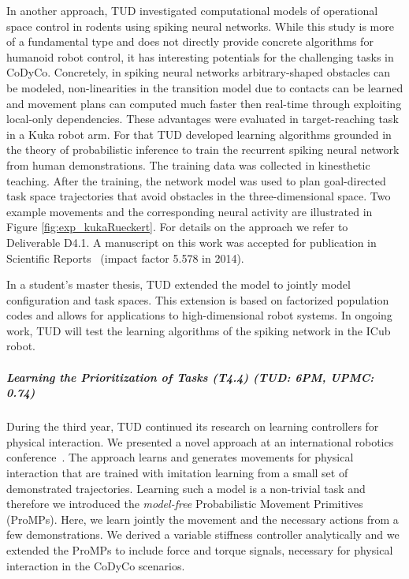 In another approach, TUD investigated computational models of operational space 
control in rodents using spiking neural networks. While this study is more of a 
fundamental type and does not directly provide concrete algorithms for humanoid 
robot control, it has interesting potentials for the challenging tasks in 
CoDyCo. Concretely, in spiking neural networks arbitrary-shaped obstacles can be 
modeled, non-linearities in the transition model due to contacts can be learned 
and movement plans can computed much faster then real-time through exploiting 
local-only dependencies. These advantages were evaluated in target-reaching task 
in a Kuka robot arm. For that TUD developed learning algorithms grounded in the 
theory of probabilistic inference to train the recurrent spiking neural network 
from human demonstrations. The training data was collected in kinesthetic 
teaching. After the training, the network model was used to plan goal-directed 
task space trajectories that avoid obstacles in the three-dimensional space. Two 
example movements and the corresponding neural activity are illustrated in 
Figure \ref{fig:exp_kukaRueckert}. For details on the approach we refer to 
Deliverable D4.1. A manuscript on this work was accepted for publication in 
Scientific Reports~\cite{Rueckert_SR_2016} (impact factor 5.578 in 2014). 

In a student's master thesis, TUD extended the model to jointly model 
configuration and task spaces. This extension is based on factorized population 
codes and allows for applications to high-dimensional robot systems. In ongoing 
work, TUD will test the learning algorithms of the spiking network in the ICub 
robot.    


\subparagraph*{Learning the Prioritization of Tasks (T4.4) (TUD: 6PM, UPMC: 0.74)}%

During the third year, TUD continued its research on learning controllers for 
physical interaction. We presented a novel approach at an international robotics 
conference~\cite{paraschos2015model}. The approach learns and generates 
movements for physical interaction that are trained with imitation learning from 
a small set of demonstrated trajectories. Learning such a model is a non-trivial 
task and therefore we introduced the \textit{model-free} Probabilistic Movement 
Primitives (ProMPs). Here, we learn jointly the movement and the necessary 
actions from a few demonstrations. We derived a variable stiffness controller 
analytically and we extended the ProMPs to include force and torque signals, 
necessary for physical interaction in the CoDyCo scenarios. 

